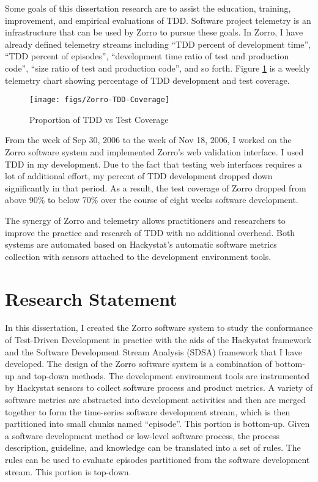 Some goals of this dissertation research are to assist the education, training, improvement, and empirical evaluations of TDD. Software project telemetry is an infrastructure that can be used by Zorro to pursue these goals. In Zorro, I have already defined telemetry streams including ``TDD percent of development time'', ``TDD percent of episodes'', ``development time ratio of test and production code'', ``size ratio of test and production code'', and so forth. Figure \ref{fig:Zorro-TDD-Coverage} is a weekly telemetry chart showing percentage of TDD development and test coverage.
\begin{figure}[htbp]
  \centering
  \texttt{[image: figs/Zorro-TDD-Coverage]}
  \caption{Proportion of TDD vs Test Coverage}
  \label{fig:Zorro-TDD-Coverage}
\end{figure}
From the week of Sep 30, 2006 to the week of Nov 18, 2006, I worked on the Zorro software system and implemented Zorro's web validation interface. I used TDD in my development. Due to the fact that testing web interfaces requires a lot of additional effort, my percent of TDD development dropped down significantly in that period. As a result, the test coverage of Zorro dropped from above 90\% to below 70\% over the course of eight weeks software development. 

The synergy of Zorro and telemetry allows practitioners and researchers to improve the practice and research of TDD with no additional overhead. Both systems are automated based on Hackystat's automatic software metrics collection with sensors attached to the development environment tools. 

\section{Research Statement}
In this dissertation, I created the Zorro software system to study the conformance of Test-Driven Development in practice with the aids of the Hackystat framework and the Software Development Stream Analysis (SDSA) framework that I have developed. The design of the Zorro software system is a combination of bottom-up and top-down methods. The development environment tools are instrumented by Hackystat sensors to collect software process and product metrics. A variety of software metrics are abstracted into development activities and then are merged together to form the time-series software development stream, which is then partitioned into small chunks named ``episode''. This portion is bottom-up. Given a software development method or low-level software process, the process description, guideline, and knowledge can be translated into a set of rules. The rules can be used to evaluate episodes partitioned from the software development stream. This portion is top-down.

